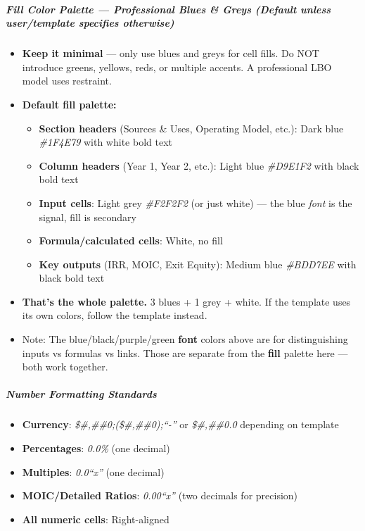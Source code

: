 \documentclass[11pt]{article}
\begin{document}
\subparagraph{Fill Color Palette — Professional Blues \& Greys (Default unless user/template specifies otherwise)}\mbox{}\par
\begin{itemize}[leftmargin=*,itemsep=2pt,topsep=2pt]
\item {} \textbf{Keep it minimal} — only use blues and greys for cell fills. Do NOT introduce greens, yellows, reds, or multiple accents. A professional LBO model uses restraint.
\item {} \textbf{Default fill palette:}
\begin{itemize}[leftmargin=*,itemsep=2pt,topsep=2pt]
\item {} \textbf{Section headers} (Sources \& Uses, Operating Model, etc.): Dark blue \emph{\#1F4E79} with white bold text
\item {} \textbf{Column headers} (Year 1, Year 2, etc.): Light blue \emph{\#D9E1F2} with black bold text
\item {} \textbf{Input cells}: Light grey \emph{\#F2F2F2} (or just white) — the blue \emph{font} is the signal, fill is secondary
\item {} \textbf{Formula/calculated cells}: White, no fill
\item {} \textbf{Key outputs} (IRR, MOIC, Exit Equity): Medium blue \emph{\#BDD7EE} with black bold text
\end{itemize}
\item {} \textbf{That's the whole palette.} 3 blues + 1 grey + white. If the template uses its own colors, follow the template instead.
\item {} Note: The blue/black/purple/green \textbf{font} colors above are for distinguishing inputs vs formulas vs links. Those are separate from the \textbf{fill} palette here — both work together.
\end{itemize}

\subparagraph{Number Formatting Standards}\mbox{}\par
\begin{itemize}[leftmargin=*,itemsep=2pt,topsep=2pt]
\item {} \textbf{Currency}: \emph{\$\#,\#\#0;(\$\#,\#\#0);``-''} or \emph{\$\#,\#\#0.0} depending on template
\item {} \textbf{Percentages}: \emph{0.0\%} (one decimal)
\item {} \textbf{Multiples}: \emph{0.0``x''} (one decimal)
\item {} \textbf{MOIC/Detailed Ratios}: \emph{0.00``x''} (two decimals for precision)
\item {} \textbf{All numeric cells}: Right-aligned
\end{itemize}
\end{document}

